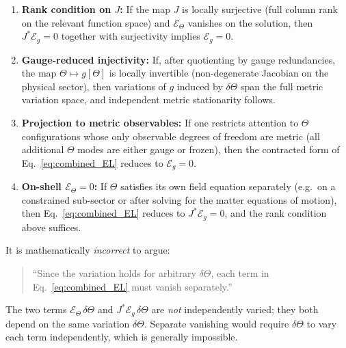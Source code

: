 \documentclass[12pt]{article}
\theoremstyle{definition}
\theoremstyle{remark}
\begin{document}
\begin{enumerate}
  \item \textbf{Rank condition on $J$:} If the map $J$ is locally surjective
    (full column rank on the relevant function space) and $\mathcal{E}_\Theta$
    vanishes on the solution, then $J^{*}\mathcal{E}_g = 0$ together with
    surjectivity implies $\mathcal{E}_g = 0$.

  \item \textbf{Gauge-reduced injectivity:} If, after quotienting by gauge
    redundancies, the map $\Theta \mapsto g[\Theta]$ is locally invertible
    (non-degenerate Jacobian on the physical sector), then variations of
    $g$ induced by $\delta\Theta$ span the full metric variation space, and
    independent metric stationarity follows.

  \item \textbf{Projection to metric observables:} If one restricts attention
    to $\Theta$ configurations whose only observable degrees of freedom are
    metric (all additional $\Theta$ modes are either gauge or frozen), then
    the contracted form of Eq.~\eqref{eq:combined_EL} reduces to
    $\mathcal{E}_g = 0$.

  \item \textbf{On-shell $\mathcal{E}_\Theta = 0$:} If $\Theta$ satisfies its
    own field equation separately (e.g.\ on a constrained sub-sector or after
    solving for the matter equations of motion), then Eq.~\eqref{eq:combined_EL}
    reduces to $J^{*}\mathcal{E}_g = 0$, and the rank condition above suffices.
\end{enumerate}

\begin{tcolorbox}[colback=yellow!10!white,colframe=orange!80!black,
                  title=Warning: Do Not Assume Arbitrary Independent Variation]
It is mathematically \emph{incorrect} to argue:
\begin{quote}
``Since the variation holds for arbitrary $\delta\Theta$, each term in
Eq.~\eqref{eq:combined_EL} must vanish separately.''
\end{quote}
The two terms $\mathcal{E}_\Theta\,\delta\Theta$ and
$J^{*}\mathcal{E}_g\,\delta\Theta$ are \emph{not} independently varied;
they both depend on the same variation $\delta\Theta$.  Separate vanishing
would require $\delta\Theta$ to vary each term independently, which is
generally impossible.
\end{tcolorbox}

\end{document}
